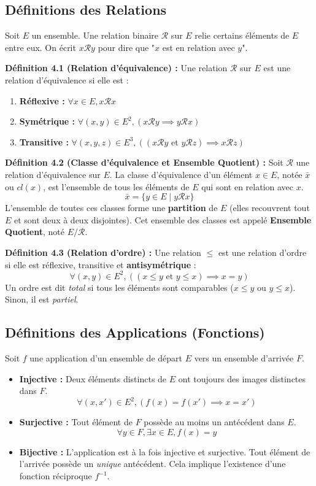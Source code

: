 \subsection{Définitions des Relations}
Soit $E$ un ensemble. Une relation binaire $\mathcal{R}$ sur $E$ relie certains éléments de $E$ entre eux. On écrit $x \mathcal{R} y$ pour dire que "$x$ est en relation avec $y$".

\textbf{Définition 4.1 (Relation d'équivalence) :}
Une relation $\mathcal{R}$ sur $E$ est une relation d'équivalence si elle est :
\begin{enumerate}
    \item \textbf{Réflexive :} $\forall x \in E, x \mathcal{R} x$
    \item \textbf{Symétrique :} $\forall (x,y) \in E^2, (x \mathcal{R} y \implies y \mathcal{R} x)$
    \item \textbf{Transitive :} $\forall (x,y,z) \in E^3, ((x \mathcal{R} y \text{ et } y \mathcal{R} z) \implies x \mathcal{R} z)$
\end{enumerate}

\textbf{Définition 4.2 (Classe d'équivalence et Ensemble Quotient) :}
Soit $\mathcal{R}$ une relation d'équivalence sur $E$. La classe d'équivalence d'un élément $x \in E$, notée $\bar{x}$ ou $cl(x)$, est l'ensemble de tous les éléments de $E$ qui sont en relation avec $x$.
$$ \bar{x} = \{ y \in E \mid y \mathcal{R} x \} $$
L'ensemble de toutes ces classes forme une \textbf{partition} de $E$ (elles recouvrent tout $E$ et sont deux à deux disjointes). Cet ensemble des classes est appelé \textbf{Ensemble Quotient}, noté $E/\mathcal{R}$.

\textbf{Définition 4.3 (Relation d'ordre) :}
Une relation $\le$ est une relation d'ordre si elle est réflexive, transitive et \textbf{antisymétrique} :
$$ \forall (x,y) \in E^2, ((x \le y \text{ et } y \le x) \implies x = y) $$
Un ordre est dit \textit{total} si tous les éléments sont comparables ($x \le y$ ou $y \le x$). Sinon, il est \textit{partiel}.

\subsection{Définitions des Applications (Fonctions)}


Soit $f$ une application d'un ensemble de départ $E$ vers un ensemble d'arrivée $F$.
\begin{itemize}
    \item \textbf{Injective :} Deux éléments distincts de $E$ ont toujours des images distinctes dans $F$.
    $$ \forall (x, x') \in E^2, (f(x) = f(x') \implies x = x') $$
    \item \textbf{Surjective :} Tout élément de $F$ possède au moins un antécédent dans $E$.
    $$ \forall y \in F, \exists x \in E, f(x) = y $$
    \item \textbf{Bijective :} L'application est à la fois injective et surjective. Tout élément de l'arrivée possède un \textit{unique} antécédent. Cela implique l'existence d'une fonction réciproque $f^{-1}$.
\end{itemize}

